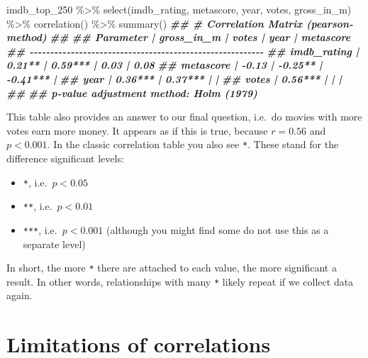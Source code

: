 \documentclass[
]{book}
\newenvironment{Shaded}{\begin{snugshade}}{\end{snugshade}}
\newcommand{\DocumentationTok}[1]{\textcolor[rgb]{0.56,0.35,0.01}{\textbf{\textit{#1}}}}
\newcommand{\FunctionTok}[1]{\textcolor[rgb]{0.00,0.00,0.00}{#1}}
\newcommand{\NormalTok}[1]{#1}
\newcommand{\SpecialCharTok}[1]{\textcolor[rgb]{0.00,0.00,0.00}{#1}}
\begin{document}
\begin{Shaded}
\begin{Highlighting}[]
\NormalTok{imdb\_top\_250 }\SpecialCharTok{\%\textgreater{}\%} 
  \FunctionTok{select}\NormalTok{(imdb\_rating, metascore, year, votes, gross\_in\_m) }\SpecialCharTok{\%\textgreater{}\%} 
  \FunctionTok{correlation}\NormalTok{() }\SpecialCharTok{\%\textgreater{}\%} 
  \FunctionTok{summary}\NormalTok{()}
\DocumentationTok{\#\# \# Correlation Matrix (pearson{-}method)}
\DocumentationTok{\#\# }
\DocumentationTok{\#\# Parameter   | gross\_in\_m |   votes |     year | metascore}
\DocumentationTok{\#\# {-}{-}{-}{-}{-}{-}{-}{-}{-}{-}{-}{-}{-}{-}{-}{-}{-}{-}{-}{-}{-}{-}{-}{-}{-}{-}{-}{-}{-}{-}{-}{-}{-}{-}{-}{-}{-}{-}{-}{-}{-}{-}{-}{-}{-}{-}{-}{-}{-}{-}{-}{-}{-}{-}{-}{-}{-}}
\DocumentationTok{\#\# imdb\_rating |     0.21** | 0.59*** |     0.03 |      0.08}
\DocumentationTok{\#\# metascore   |      {-}0.13 | {-}0.25** | {-}0.41*** |          }
\DocumentationTok{\#\# year        |    0.36*** | 0.37*** |          |          }
\DocumentationTok{\#\# votes       |    0.56*** |         |          |          }
\DocumentationTok{\#\# }
\DocumentationTok{\#\# p{-}value adjustment method: Holm (1979)}
\end{Highlighting}
\end{Shaded}

This table also provides an answer to our final question, i.e.~do movies with more votes earn more money. It appears as if this is true, because \(r = 0.56\) and \(p < 0.001\). In the classic correlation table you also see \texttt{*}. These stand for the difference significant levels:

\begin{itemize}
\item
  \texttt{*}, i.e.~\(p < 0.05\)
\item
  \texttt{**}, i.e.~\(p < 0.01\)
\item
  \texttt{***}, i.e.~\(p < 0.001\) (although you might find some do not use this as a separate level)
\end{itemize}

In short, the more \texttt{*} there are attached to each value, the more significant a result. In other words, relationships with many \texttt{*} likely repeat if we collect data again.

\hypertarget{limitations-of-correlations}{%
\section{Limitations of correlations}\label{limitations-of-correlations}}
\end{document}
